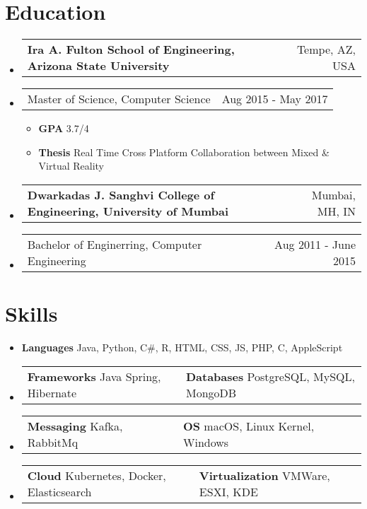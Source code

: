 \documentclass[a4paper,12pt]{article} %
\makeatletter
\newcommand\tableVerticalSpace{-1em}
\newcommand\tableItemVerticalSpace{-1em}
\newcommand\zeroSpacing{0em}
\newcommand\sectionSpacing{0.5em}
\newcommand{\fourElementListStart}{\begin{itemize}[label={},leftmargin=*]\setlength\itemsep{0.3em}}
\newcommand{\fourElementListEnd}{\end{itemize}\vspace{\zeroSpacing}}
\newcommand{\generalListStart}{\vspace{-0.5em}\begin{itemize}[leftmargin=2em]\setlength\itemsep{-0.4em}}
\newcommand{\generalListEnd}{\end{itemize}\vspace{\zeroSpacing}}
\newcommand{\generalSubListStart}{\vspace{-1em}\begin{itemize}[leftmargin=2em]\setlength\itemsep{-0.2em}}
\newcommand{\generalSubListEnd}{\end{itemize}\vspace{\zeroSpacing}}
\newcommand{\institutionItem}[2]{
	\vspace{\tableItemVerticalSpace}\item
		\begin{tabular*}{\textwidth}{@{}l@{\extracolsep{\fill}}r@{}}
			\textbf{#1} & {\small{#2}} \\[\zeroSpacing]
		\end{tabular*}\vspace{\tableVerticalSpace}
}
\newcommand{\twoElementItem}[2]{
	\vspace{\tableItemVerticalSpace}\item
		\begin{tabular*}{\textwidth}{@{}l@{\extracolsep{\fill}}r@{}}
			{#1} & {\small{#2}} \\[\zeroSpacing]
		\end{tabular*}\vspace{\tableVerticalSpace}
}
\newcommand{\twoKeyValuePairElementItem}[4]{
	\vspace{\tableItemVerticalSpace}\item
		\begin{tabular}{@{}p{7cm}p{11cm}}

			\vspace{0.5em}\textbf{#1}{ #2} & \vspace{0.5em}\textbf{#3}{ #4}

		\end{tabular}\vspace{\tableVerticalSpace}
}
\newcommand{\oneKeyValuePairElement}[2]{
	\item \textbf{#1}{ #2}
}
\makeatother
\begin{document}
\vspace{\sectionSpacing}\section*{Education}

\fourElementListStart
	\institutionItem {Ira A. Fulton School of Engineering, Arizona State University}{Tempe, AZ, USA}
	\twoElementItem {Master of Science, Computer Science}{Aug 2015 - May 2017}
	\generalSubListStart
		\item \textbf{GPA} 3.7/4
		\item \textbf{Thesis} Real Time Cross Platform Collaboration between Mixed \& Virtual Reality
	\generalSubListEnd
	\institutionItem {Dwarkadas J. Sanghvi College of Engineering, University of Mumbai}{Mumbai, MH, IN}
	\twoElementItem {Bachelor of Enginerring, Computer Engineering}{Aug 2011 - June 2015}
\fourElementListEnd


\vspace{\sectionSpacing}\section*{Skills}

\generalListStart
	\oneKeyValuePairElement{Languages}{Java, Python, C\#, R, HTML, CSS, JS, PHP, C, AppleScript}
	\twoKeyValuePairElementItem{Frameworks}{Java Spring, Hibernate}{Databases}{PostgreSQL, MySQL, MongoDB}
	\vspace{-0.5em}\twoKeyValuePairElementItem{Messaging}{Kafka, RabbitMq}{OS}{macOS, Linux Kernel, Windows}
	\vspace{-0.5em}\twoKeyValuePairElementItem{Cloud}{Kubernetes, Docker, Elasticsearch}{Virtualization}{VMWare, ESXI, KDE}
\generalListEnd

\end{document}
